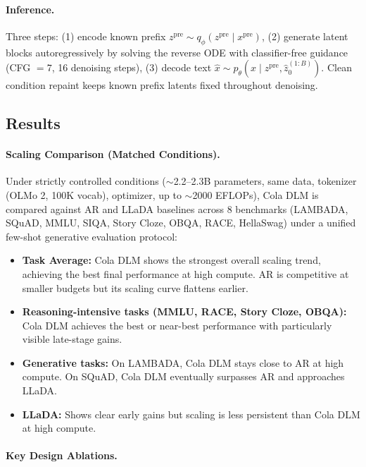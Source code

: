 \documentclass[11pt]{article}
\begin{document}
\paragraph{Inference.}
Three steps: (1) encode known prefix $z^{\mathrm{pre}} \sim q_\phi(z^{\mathrm{pre}} \mid x^{\mathrm{pre}})$, (2) generate latent blocks autoregressively by solving the reverse ODE with classifier-free guidance (CFG $= 7$, 16 denoising steps), (3) decode text $\hat{x} \sim p_\theta(x \mid z^{\mathrm{pre}}, \hat{z}_0^{(1:B)})$. Clean condition repaint keeps known prefix latents fixed throughout denoising.

\subsection{Results}

\paragraph{Scaling Comparison (Matched Conditions).}
Under strictly controlled conditions ($\sim$2.2--2.3B parameters, same data, tokenizer (OLMo 2, 100K vocab), optimizer, up to $\sim$2000 EFLOPs), Cola DLM is compared against AR and LLaDA baselines across 8 benchmarks (LAMBADA, SQuAD, MMLU, SIQA, Story Cloze, OBQA, RACE, HellaSwag) under a unified few-shot generative evaluation protocol:

\begin{itemize}
    \item \textbf{Task Average:} Cola DLM shows the strongest overall scaling trend, achieving the best final performance at high compute. AR is competitive at smaller budgets but its scaling curve flattens earlier.
    \item \textbf{Reasoning-intensive tasks (MMLU, RACE, Story Cloze, OBQA):} Cola DLM achieves the best or near-best performance with particularly visible late-stage gains.
    \item \textbf{Generative tasks:} On LAMBADA, Cola DLM stays close to AR at high compute. On SQuAD, Cola DLM eventually surpasses AR and approaches LLaDA.
    \item \textbf{LLaDA:} Shows clear early gains but scaling is less persistent than Cola DLM at high compute.
\end{itemize}

\paragraph{Key Design Ablations.}
\end{document}
